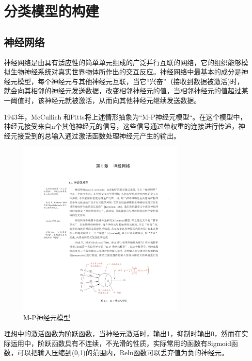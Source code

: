 \section{分类模型的构建}
\subsection{神经网络}
神经网络是由具有适应性的简单单元组成的广泛并行互联的网络，它的组织能够模拟生物神经系统对真实世界物体所作出的交互反应\cite{kohonen1988introduction}。神经网络中最基本的成分是神经元模型，每个神经元与其他神经元互联，当它“兴奋”（接收到数据被激活)时，就会向其相邻的神经元发送数据，改变相邻神经元的值，当相邻神经元的值超过某一阈值时，该神经元就被激活，从而向其他神经元继续发送数据。
\par 1943年，McCullich 和Pitts\cite{mcculloch1943logical}将上述情形抽象为“M-P神经元模型“。在这个模型中，神经元接受来自n个其他神经元的信号，这些信号通过带权重的连接进行传递，神经元接受到的总输入通过激活函数处理神经元产生的输出。
\begin{figure}[htbp]
	\begin{center}
		\includegraphics[width=0.75\textwidth]{figures//2.pdf}
		\caption{M-P神经元模型}
		\label{default}
	\end{center}
\end{figure}
\par 理想中的激活函数为阶跃函数，当神经元激活时，输出1，抑制时输出0，然而在实际运用中，阶跃函数具有不连续，不光滑的性质，实际常用的函数有Sigmoid函数，可以把输入压缩到(0,1)的范围内，Relu函数可以丢弃值为负的神经元。
